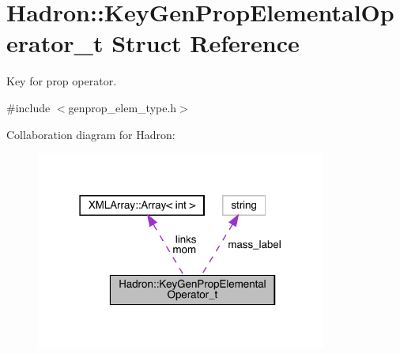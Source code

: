 \hypertarget{structHadron_1_1KeyGenPropElementalOperator__t}{}\section{Hadron\+:\+:Key\+Gen\+Prop\+Elemental\+Operator\+\_\+t Struct Reference}
\label{structHadron_1_1KeyGenPropElementalOperator__t}


Key for prop operator.  




{\ttfamily \#include $<$genprop\+\_\+elem\+\_\+type.\+h$>$}



Collaboration diagram for Hadron\+:\nopagebreak
\begin{figure}[H]
\begin{center}
\leavevmode
\includegraphics[width=271pt]{d1/db9/structHadron_1_1KeyGenPropElementalOperator__t__coll__graph}
\end{center}
\end{figure}
